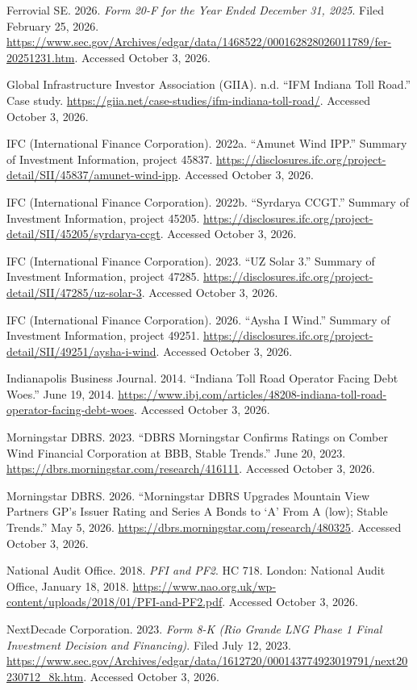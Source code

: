 \begin{sloppypar}
\begin{sources}
\item Ferrovial SE. 2026. \textit{Form 20-F for the Year Ended December 31, 2025}. Filed February 25, 2026. \url{https://www.sec.gov/Archives/edgar/data/1468522/000162828026011789/fer-20251231.htm}. Accessed October 3, 2026.
\item Global Infrastructure Investor Association (GIIA). n.d. ``IFM Indiana Toll Road.'' Case study. \url{https://giia.net/case-studies/ifm-indiana-toll-road/}. Accessed October 3, 2026.
\item IFC (International Finance Corporation). 2022a. ``Amunet Wind IPP.'' Summary of Investment Information, project 45837. \url{https://disclosures.ifc.org/project-detail/SII/45837/amunet-wind-ipp}. Accessed October 3, 2026.
\item IFC (International Finance Corporation). 2022b. ``Syrdarya CCGT.'' Summary of Investment Information, project 45205. \url{https://disclosures.ifc.org/project-detail/SII/45205/syrdarya-ccgt}. Accessed October 3, 2026.
\item IFC (International Finance Corporation). 2023. ``UZ Solar 3.'' Summary of Investment Information, project 47285. \url{https://disclosures.ifc.org/project-detail/SII/47285/uz-solar-3}. Accessed October 3, 2026.
\item IFC (International Finance Corporation). 2026. ``Aysha I Wind.'' Summary of Investment Information, project 49251. \url{https://disclosures.ifc.org/project-detail/SII/49251/aysha-i-wind}. Accessed October 3, 2026.
\item Indianapolis Business Journal. 2014. ``Indiana Toll Road Operator Facing Debt Woes.'' June 19, 2014. \url{https://www.ibj.com/articles/48208-indiana-toll-road-operator-facing-debt-woes}. Accessed October 3, 2026.
\item Morningstar DBRS. 2023. ``DBRS Morningstar Confirms Ratings on Comber Wind Financial Corporation at BBB, Stable Trends.'' June 20, 2023. \url{https://dbrs.morningstar.com/research/416111}. Accessed October 3, 2026.
\item Morningstar DBRS. 2026. ``Morningstar DBRS Upgrades Mountain View Partners GP's Issuer Rating and Series A Bonds to `A' From A (low); Stable Trends.'' May 5, 2026. \url{https://dbrs.morningstar.com/research/480325}. Accessed October 3, 2026.
\item National Audit Office. 2018. \textit{PFI and PF2}. HC 718. London: National Audit Office, January 18, 2018. \url{https://www.nao.org.uk/wp-content/uploads/2018/01/PFI-and-PF2.pdf}. Accessed October 3, 2026.
\item NextDecade Corporation. 2023. \textit{Form 8-K (Rio Grande LNG Phase 1 Final Investment Decision and Financing)}. Filed July 12, 2023. \url{https://www.sec.gov/Archives/edgar/data/1612720/000143774923019791/next20230712_8k.htm}. Accessed October 3, 2026.

\end{sources}
\end{sloppypar}
